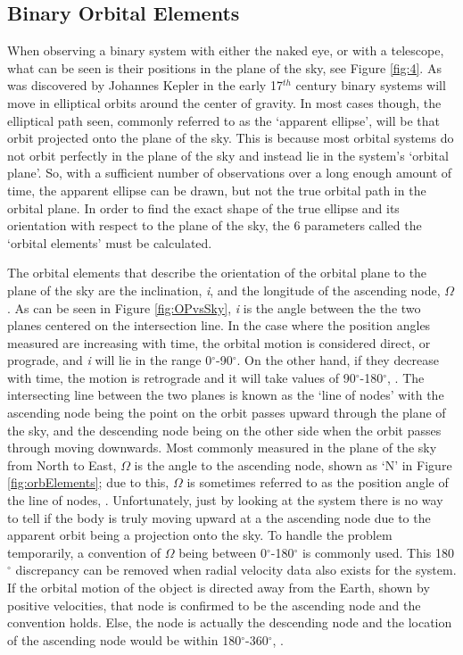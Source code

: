 \documentclass[12pt,preprint]{aastex}
\begin{document}
\clearpage

\subsection{Binary Orbital Elements}\label{sec:BinaryOrbElements}

When observing a binary system with either the naked eye, or with a telescope, what can be seen is their positions in the plane of the sky, see Figure \ref{fig:4}.  As was discovered by Johannes Kepler in the early 17$^{th}$ century binary systems will move in elliptical orbits around the center of gravity.  In most cases though, the elliptical path seen, commonly referred to as the `apparent ellipse', will be that orbit projected onto the plane of the sky.  This is because most orbital systems do not orbit perfectly in the plane of the sky and instead lie in the system's `orbital plane'.  So, with a sufficient number of observations over a long enough amount of time, the apparent ellipse can be drawn, but not the true orbital path in the orbital plane.  In order to find the exact shape of the true ellipse and its orientation with respect to the plane of the sky, the 6 parameters called the `orbital elements' must be calculated.

The orbital elements that describe the orientation of the orbital plane to the plane of the sky are the inclination, {\it i}, and the longitude of the ascending node, $\Omega$.  As can be seen in Figure \ref{fig:OPvsSky}, {\it i} is the angle between the the two planes centered on the intersection line.  In the case where the position angles measured are increasing with time, the orbital motion is considered direct, or prograde, and {\it i} will lie in the range 0$^{\circ}$-90$^{\circ}$.  On the other hand, if they decrease with time, the motion is retrograde and it will take values of 90$^{\circ}$-180$^{\circ}$, \citep{heintz}.  The intersecting line between the two planes is known as the `line of nodes' with the ascending node being the point on the orbit passes upward through the plane of the sky, and the descending node being on the other side when the orbit passes through moving downwards.  Most commonly measured in the plane of the sky from North to East, $\Omega$ is the angle to the ascending node, shown as `N' in Figure \ref{fig:orbElements}; due to this, $\Omega$ is sometimes referred to as the position angle of the line of nodes, \citep{binnendijk}.  Unfortunately, just by looking at the system there is no way to tell if the body is truly moving upward at a the ascending node due to the apparent orbit being a projection onto the sky.  To handle the problem temporarily, a convention of $\Omega$ being between 0$^{\circ}$-180$^{\circ}$ is commonly used.  This 180$^{\circ}$ discrepancy can be removed when radial velocity data also exists for the system.  If the orbital motion of the object is directed away from the Earth, shown by positive velocities, that node is confirmed to be the ascending node and the convention holds.  Else, the node is actually the descending node and the location of the ascending node would be within 180$^{\circ}$-360$^{\circ}$, \citep{heintz}.
 
\end{document}
